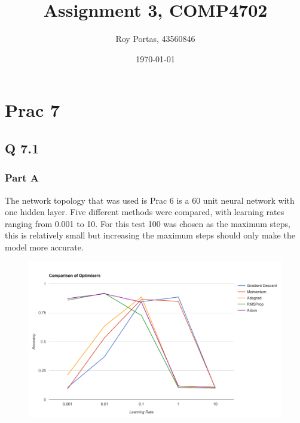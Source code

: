 
\usepackage{mathtools}

\title{Assignment 3, COMP4702}
\author{Roy Portas, 43560846}
\date{\today}



\begin{titlepage}
    \maketitle
\end{titlepage}

\section*{Prac 7}

\subsection*{Q 7.1}

\subsubsection*{Part A}

The network topology that was used is Prac 6 is a 60 unit neural network with one hidden layer.
Five different methods were compared, with learning rates ranging from 0.001 to 10.
For this test 100 was chosen as the maximum steps, 
this is relatively small but increasing the maximum steps should only make the model more accurate.

\begin{figure}[H]
	\centering
	\includegraphics[width=\linewidth]{images/q7_optimisers}
\end{figure}

